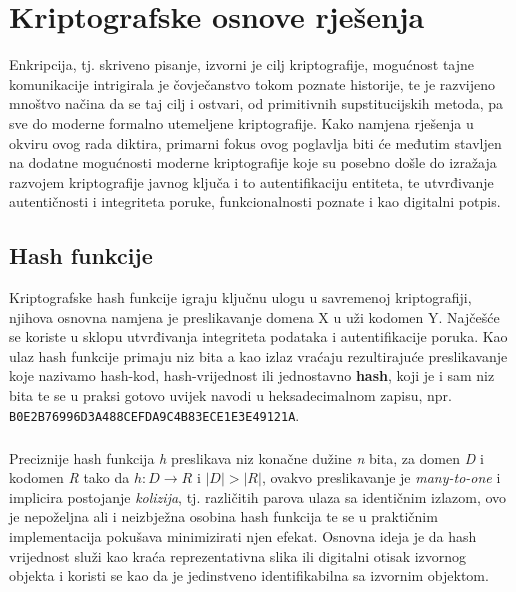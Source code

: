 \chapter{Kriptografske osnove rješenja}
Enkripcija, tj. skriveno pisanje, izvorni je cilj kriptografije\cite{ferguson2011cryptography}, mogućnost tajne komunikacije intrigirala je čovječanstvo tokom poznate historije, te je razvijeno mnoštvo načina da se taj cilj i ostvari, od primitivnih supstitucijskih metoda, pa sve do moderne formalno utemeljene kriptografije\cite{singh2000code}. Kako namjena rješenja u okviru ovog rada diktira, primarni fokus ovog poglavlja biti će međutim stavljen na dodatne mogućnosti moderne kriptografije koje su posebno došle do izražaja razvojem kriptografije javnog ključa i to autentifikaciju entiteta, te utvrđivanje autentičnosti i integriteta poruke, funkcionalnosti poznate i kao digitalni potpis.

\section{Hash funkcije}
Kriptografske hash funkcije igraju ključnu ulogu u savremenoj kriptografiji, njihova osnovna namjena je preslikavanje domena X u uži kodomen Y. Najčešće se koriste u sklopu utvrđivanja integriteta podataka i autentifikacije poruka. Kao ulaz hash funkcije primaju niz bita a kao izlaz vraćaju rezultirajuće preslikavanje koje nazivamo hash-kod, hash-vrijednost ili jednostavno \textbf{hash}\cite{katz1996handbook}, koji je i sam niz bita te se u praksi gotovo uvijek navodi u heksadecimalnom zapisu, npr. \texttt{B0E2B76996D3A488CEFDA9C4B83ECE1E3E49121A}.

\paragraph*{}
Preciznije hash funkcija \textit{h} preslikava niz konačne dužine \textit{n} bita, za domen \textit{D} i kodomen \textit{R} tako da \(h: D \to R\) i \(|D|>|R|\), ovakvo preslikavanje je \textit{many-to-one} i implicira postojanje \textit{kolizija}, tj. različitih parova ulaza sa identičnim izlazom, ovo je nepoželjna ali i neizbježna osobina hash funkcija te se u praktičnim implementacija pokušava minimizirati njen efekat. Osnovna ideja je da hash vrijednost služi kao kraća reprezentativna slika ili digitalni otisak izvornog objekta i koristi se kao da je jedinstveno identifikabilna sa izvornim objektom.

